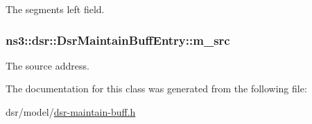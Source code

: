 The segments left field. 

\subsubsection[{\texorpdfstring{m\+\_\+src}{m_src}}]{ ns3\+::dsr\+::\+Dsr\+Maintain\+Buff\+Entry\+::m\+\_\+src\hspace{0.3cm}{\ttfamily [private]}}\hypertarget{classns3_1_1dsr_1_1DsrMaintainBuffEntry_ad3ffaac5b36e8a3b2ac15a47339b975f}{}\label{classns3_1_1dsr_1_1DsrMaintainBuffEntry_ad3ffaac5b36e8a3b2ac15a47339b975f}


The source address. 



The documentation for this class was generated from the following file\+:\begin{DoxyCompactItemize}
\item 
dsr/model/\hyperlink{dsr-maintain-buff_8h}{dsr-\/maintain-\/buff.\+h}\end{DoxyCompactItemize}
